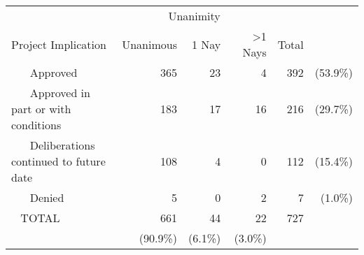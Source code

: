 \begin{tabular}{lrrrrr} \toprule
 & \multicolumn{3}{c}{Unanimity} &  & \\ 
Project Implication & Unanimous & 1 Nay & >1 Nays & Total &  \\ \midrule
~ ~ Approved & 365 & 23 & 4 & 392 & (53.9\%) \\ [1ex] 
~ ~ Approved in part or with conditions & 183 & 17 & 16 & 216 & (29.7\%) \\ [1ex] 
~ ~ Deliberations continued to future date & 108 & 4 & 0 & 112 & (15.4\%) \\ [1ex] 
~ ~ Denied & 5 & 0 & 2 & 7 & (1.0\%) \\ [1ex] 
~ TOTAL & 661 & 44 & 22 & 727 &  \\ [1ex] 
 & (90.9\%) & (6.1\%) & (3.0\%) &  &  \\ [1ex] 
\bottomrule
\end{tabular}
